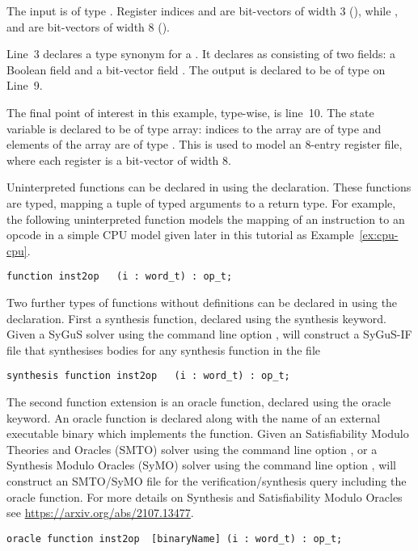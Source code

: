 The input  is of type . Register indices  and  are bit-vectors of width 3 (), while ,  and  are bit-vectors of width 8 ().

Line~3 declares a type synonym for a . It declares  as consisting of two fields: a Boolean field  and a bit-vector field . The output  is declared to be of type  on Line~9.

The final point of interest in this example, type-wise, is line~10. The state variable  is declared to be of type array: indices to the array are of type  and elements of the array are of type . This is used to model an 8-entry register file, where each register is a bit-vector of width 8.

Uninterpreted functions can be declared in \uclid{} using the
 declaration. These functions are typed,
mapping a tuple of typed arguments to a return type.
For example, the following uninterpreted function models
the mapping of an instruction to an opcode in a simple
CPU model given later in this tutorial as Example~\ref{ex:cpu-cpu}.
\begin{lstlisting}[language=uclid,style=uclidstyle]
  function inst2op   (i : word_t) : op_t;
\end{lstlisting}

Two further types of functions without definitions can be declared in \uclid{} using the
 declaration. 
First a synthesis function, declared using the synthesis keyword. Given a SyGuS solver using the command line option ,
\uclid{} will construct
a SyGuS-IF file that synthesises bodies for any synthesis function in the \uclid{} file
\begin{lstlisting}[language=uclid,style=uclidstyle]
  synthesis function inst2op   (i : word_t) : op_t;
\end{lstlisting}

The second function extension is an oracle function, declared using the oracle keyword. An oracle function is declared along with the name of an external executable binary which implements the function. Given an Satisfiability Modulo Theories and Oracles (SMTO) solver using the command line option , or a Synthesis Modulo Oracles (SyMO) solver using the command line option ,
\uclid{} will construct
an SMTO/SyMO file for the verification/synthesis query including the oracle function. For more details on Synthesis and Satisfiability Modulo Oracles see \url{https://arxiv.org/abs/2107.13477}.
\begin{lstlisting}[language=uclid,style=uclidstyle]
  oracle function inst2op  [binaryName] (i : word_t) : op_t;
\end{lstlisting}

